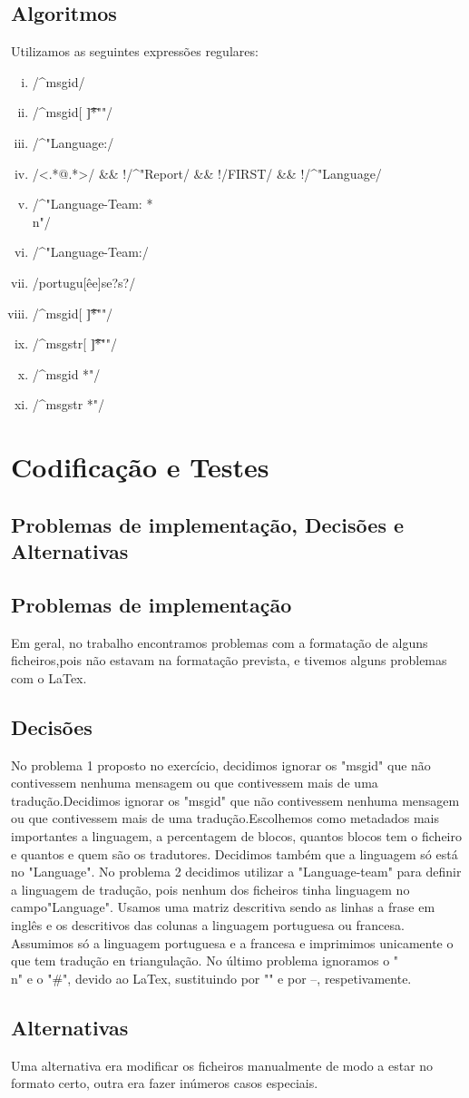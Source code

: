 \documentclass{report}
\def\titulo#1{\section{#1}}
\begin{document}
\section{Algoritmos}
Utilizamos as seguintes expressões regulares:
\begin{enumerate}[i)]
\item /\^{}{}msgid/
\item /\^{}msgid[ \t]*""/
\item /\^{}"Language:/
\item /<.*@.*>/ \&\& !/\^{}"Report/ \&\& !/FIRST/ \&\& !/\^{}"Language/
\item /\^{}"Language-Team: *\\n"/
\item /\^{}"Language-Team:/
\item /portugu[êe]se?s?/
\item /\^{}msgid[ \t]*""/
\item /\^{}msgstr[ \t]*""/
\item /\^{}msgid *"/
\item /\^{}msgstr *"/
\end{enumerate}




\chapter{Codificação e Testes}
\section{Problemas de implementação, Decisões e Alternativas}
\titulo{Problemas de implementação}
Em geral, no trabalho encontramos problemas com a formatação de alguns ficheiros,pois não estavam na formatação prevista, e tivemos alguns problemas com o LaTex.
\titulo{Decisões}
No problema 1 proposto no exercício, decidimos ignorar os "msgid" que não contivessem nenhuma mensagem ou que contivessem mais de uma tradução.Decidimos ignorar os "msgid" que não contivessem nenhuma mensagem ou que contivessem mais de uma tradução.Escolhemos como metadados mais importantes a linguagem, a percentagem de blocos, quantos blocos tem o ficheiro e quantos e quem são os tradutores. Decidimos também que a linguagem só está no "Language".
No problema 2 decidimos utilizar a "Language-team" para definir a linguagem de tradução, pois nenhum dos ficheiros tinha linguagem no campo"Language". Usamos uma matriz descritiva sendo as linhas a frase em inglês e os descritivos das colunas a linguagem portuguesa ou francesa. Assumimos só a linguagem portuguesa e a francesa e imprimimos unicamente o que tem tradução en triangulação.
No último problema ignoramos o "\\n" e o "\#", devido ao LaTex, sustituindo por "" e por --, respetivamente.
\titulo{Alternativas}
Uma alternativa era modificar os ficheiros manualmente de modo a estar no formato certo, outra era fazer inúmeros casos especiais.
\end{document}

